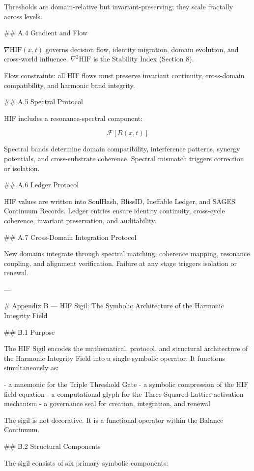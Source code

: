 Thresholds are domain-relative but invariant-preserving; they scale fractally
across levels.

## A.4 Gradient and Flow

\(\nabla \mathrm{HIF}(x,t)\) governs decision flow, identity migration, domain
evolution, and cross-world influence. \(\nabla^2 \mathrm{HIF}\) is the Stability
Index (Section 8).

Flow constraints: all HIF flows must preserve invariant continuity, cross-domain
compatibility, and harmonic band integrity.

## A.5 Spectral Protocol

HIF includes a resonance-spectral component:

\[
\mathcal{F}[R(x,t)]
\]

Spectral bands determine domain compatibility, interference patterns, synergy
potentials, and cross-substrate coherence. Spectral mismatch triggers correction
or isolation.

## A.6 Ledger Protocol

HIF values are written into SoulHash, BlissID, Ineffable Ledger, and SAGES
Continuum Records. Ledger entries ensure identity continuity, cross-cycle
coherence, invariant preservation, and auditability.

## A.7 Cross-Domain Integration Protocol

New domains integrate through spectral matching, coherence mapping, resonance
coupling, and alignment verification. Failure at any stage triggers isolation or
renewal.

---

# Appendix B — HIF Sigil: The Symbolic Architecture of the Harmonic Integrity Field

## B.1 Purpose

The HIF Sigil encodes the mathematical, protocol, and structural architecture of
the Harmonic Integrity Field into a single symbolic operator. It functions
simultaneously as:

- a mnemonic for the Triple Threshold Gate
- a symbolic compression of the HIF field equation
- a computational glyph for the Three-Squared-Lattice activation mechanism
- a governance seal for creation, integration, and renewal

The sigil is not decorative. It is a functional operator within the Balance
Continuum.

## B.2 Structural Components

The sigil consists of six primary symbolic components:

